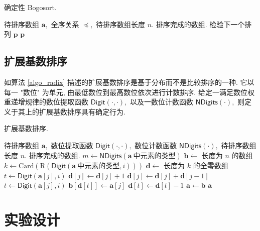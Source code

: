 \documentclass[12pt]{article}
\begin{document}
\begin{algorithm}[H]
\caption{确定性 Bogosort.}
\label{algo_bogosort_determ}
\begin{algorithmic}[1]
\Require 待排序数组 $\bm{a},$ 全序关系 $\preceq,$ 待排序数组长度 $n.$
\Ensure 排序完成的数组.
            \State 检验下一个排列 $\bm{p}$
        \EndIf
    \EndFor
    \State \Return $\bm{p}$
\EndFor
\end{algorithmic}
\end{algorithm}

\subsection{扩展基数排序}

如算法 \ref{algo_radix} 描述的扩展基数排序是基于分布而不是比较排序的一种. 它以每一 "数位" 为单元, 由最低数位到最高数位依次进行计数排序. 给定一满足数位权重递增规律的数位提取函数 $\mathsf{Digit}(\cdot, \cdot),$ 以及一数位计数函数 $\mathsf{NDigits(\cdot)},$ 则定义于其上的扩展基数排序具有确定行为.

\begin{algorithm}[H]
\caption{扩展基数排序.}
\label{algo_radix}
\begin{algorithmic}[1]
\Require 待排序数组 $\bm{a},$ 数位提取函数 $\mathsf{Digit}(\cdot, \cdot),$ 数位计数函数 $\mathsf{NDigits(\cdot)},$ 待排序数组长度 $n.$
\Ensure 排序完成的数组.
\State $m \gets \mathsf{NDigits}(\bm{a}\ \text{中元素的类型})$
\State $\bm{b} \gets$ 长度为 $n$ 的数组
    \State $k \gets \mathrm{Card}\left(\mathrm{R}(\mathsf{Digit}(\bm{a}\ \text{中元素的类型}, i))\right)$
    \State $\bm{d} \gets$ 长度为 $k$ 的全零数组
        \State $t \gets \mathsf{Digit}(\bm{a}[j], i)$
        \State $\bm{d}[j] \gets \bm{d}[j] + 1$
    \EndFor
        \State $\bm{d}[j] \gets \bm{d}[j] + \bm{d}[j - 1]$
    \EndFor
        \State $t \gets \mathsf{Digit}(\bm{a}[j], i)$
        \State $\bm{b}[\bm{d}[t]] \gets \bm{a}[j]$
        \State $\bm{d}[t] \gets \bm{d}[t] - 1$
    \EndFor
    \State $\bm{a} \gets \bm{b}$
\EndFor
\State \Return $\bm{a}$
\end{algorithmic}
\end{algorithm}

\section{实验设计}
\end{document}
